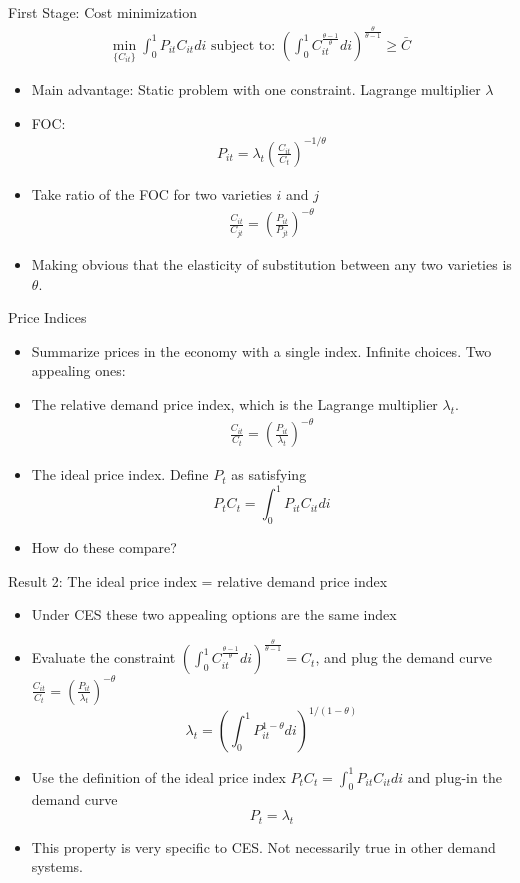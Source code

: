 \documentclass[11pt,aspectratio=169,xcolor={dvipsnames},hyperref={pdftex,pdfpagemode=UseNone,hidelinks,pdfdisplaydoctitle=true},usepdftitle=false]{beamer}
\begin{document}
\begin{frame}{First Stage: Cost minimization}
\begin{align*}
\min_{\{C_{it}\}} \int_0^1 P_{it} C_{it} di \text{   subject to:  } \left(\int_0^1 C^{\frac{\theta-1}{\theta}}_{it} di \right)^{\frac{\theta}{\theta-1}} \geq \bar{C}
\end{align*}
\begin{itemize}
\item Main advantage: Static problem with one constraint. Lagrange multiplier $\lambda$
\item FOC:
\begin{align*}
P_{it} = \lambda_t \left(\frac{C_{it}}{C_t}\right)^{-1/\theta}
\end{align*}
\item Take ratio of the FOC for two varieties $i$ and $j$
\begin{align*}
\frac{C_{it}}{C_{jt}} = \left(\frac{P_{it}}{P_{jt}}\right)^{-\theta}
\end{align*}
\item Making obvious that the elasticity of substitution between any two varieties is $\theta$.
\end{itemize}
\end{frame}


\begin{frame}{Price Indices}
\begin{itemize}
\item Summarize prices in the economy with a single index. Infinite choices. Two appealing ones:
\item The relative demand price index, which is the Lagrange multiplier $\lambda_t$.
\begin{align*}
\frac{C_{it}}{C_{t}} = \left(\frac{P_{it}}{\lambda_t}\right)^{-\theta}
\end{align*}
\item The ideal price index. Define $P_t$ as satisfying $$P_t C_t = \int_0^1 P_{it} C_{it} di $$
\item How do these compare?
\end{itemize}
\end{frame}

\begin{frame}{Result 2: The ideal price index = relative demand price index}
\begin{itemize}
\item Under CES these two appealing options are the same index
\item Evaluate the constraint $ \left(\int_0^1 C^{\frac{\theta-1}{\theta}}_{it} di \right)^{\frac{\theta}{\theta-1}} = C_t$, and plug the demand curve $\frac{C_{it}}{C_{t}} = \left(\frac{P_{it}}{\lambda_t}\right)^{-\theta}$
$$\lambda_t = \left(\int_0^1 P_{it}^{1-\theta} di \right)^{1/(1-\theta)}$$
\item Use the definition of the ideal price index $P_t C_t = \int_0^1 P_{it} C_{it} di $ and plug-in the demand curve
$$P_t = \lambda_t$$
\item This property is very specific to CES. Not necessarily true in other demand systems.
\end{itemize}
\end{frame}
\end{document}
